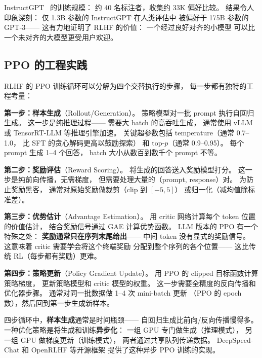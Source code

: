 InstructGPT~\cite{ouyang2022rlhf} 的训练规模：
约 40 名标注者，收集约 33K 偏好比较。
结果令人印象深刻：
仅 1.3B 参数的 InstructGPT 在人类评估中
被偏好于 175B 参数的 GPT-3——
这有力地证明了 RLHF 的价值：
一个经过良好对齐的小模型
可以比一个未对齐的大模型更受用户欢迎。

\subsection{PPO 的工程实践}

RLHF 的 PPO 训练循环可以分解为四个交替执行的步骤，
每一步都有独特的工程考量：

\textbf{第一步：样本生成}（Rollout/Generation）。
策略模型对一批 prompt 执行自回归生成。
这一步是纯推理过程——
需要大 batch 的高吞吐生成，
通常使用 vLLM 或 TensorRT-LLM 等推理引擎加速。
关键超参数包括 temperature（通常 0.7--1.0，
比 SFT 的贪心解码更高以鼓励探索）
和 top-$p$（通常 0.9--0.95）。
每个 prompt 生成 1--4 个回答，
batch 大小从数百到数千个 prompt 不等。

\textbf{第二步：奖励评估}（Reward Scoring）。
将生成的回答送入奖励模型打分。
这一步是纯前向传播，无需梯度，
但需要处理大量的（prompt, response）对。
为防止奖励黑客，
通常对原始奖励做裁剪（clip 到 $[-5, 5]$）
或归一化（减均值除标准差）。

\textbf{第三步：优势估计}（Advantage Estimation）。
用 critic 网络计算每个 token 位置的价值估计，
结合奖励信号通过 GAE 计算优势函数。
LLM 版本的 PPO 有一个特殊之处：
\textbf{奖励通常只在序列末尾给出}——
中间 token 没有显式的奖励信号。
这意味着 critic 需要学会将这个终端奖励
分配到整个序列的各个位置——
这比传统 RL（每步都有奖励）更难。

\textbf{第四步：策略更新}（Policy Gradient Update）。
用 PPO 的 clipped 目标函数计算策略梯度，
更新策略模型和 critic 模型的权重。
这一步需要全精度的反向传播和优化器步骤。
通常对同一批数据做 1--4 次 mini-batch 更新
（PPO 的 epoch 数），然后回到第一步生成新样本。

四步循环中，\textbf{样本生成}通常是时间瓶颈——
自回归生成比前向/反向传播慢得多。
一种优化策略是将生成和训练\textbf{异步化}：
一组 GPU 专门做生成（推理模式），
另一组 GPU 做梯度更新（训练模式），
两者通过共享队列传递数据。
DeepSpeed-Chat 和 OpenRLHF 等开源框架
提供了这种异步 PPO 训练的实现。

